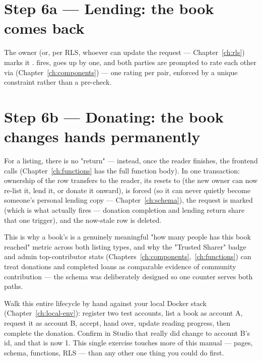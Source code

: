 \section{Step 6a — Lending: the book comes back}

The owner (or, per RLS, whoever can update the request — Chapter~\ref{ch:rls}) marks it .  fires,  goes up by one, and both parties are prompted to rate each other via  (Chapter~\ref{ch:components}) — one rating per  pair, enforced by a unique constraint rather than a pre-check.

\section{Step 6b — Donating: the book changes hands permanently}

For a  listing, there is no "return" — instead, once the reader finishes, the frontend calls  (Chapter~\ref{ch:functions} has the full function body). In one  transaction: ownership of the  row transfers to the reader, its  resets to  (the new owner can now re-list it, lend it, or donate it onward),  is forced  (so it can never quietly become someone's personal lending copy — Chapter~\ref{ch:schema}), the request is marked  (which is what actually fires  — donation completion and lending return share that one trigger), and the now-stale  row is deleted.

\begin{olknote}
This is why a book's  is a genuinely meaningful "how many people has this book reached" metric across both listing types, and why the "Trusted Sharer" badge and admin top-contributor stats (Chapters~\ref{ch:components},~\ref{ch:functions}) can treat donations and completed loans as comparable evidence of community contribution — the schema was deliberately designed so one counter serves both paths.
\end{olknote}

\begin{olktask}
Walk this entire lifecycle by hand against your local Docker stack (Chapter~\ref{ch:local-env}): register two test accounts, list a  book as account A, request it as account B, accept, hand over, update reading progress, then complete the donation. Confirm in Studio that  really did change to account B's id, and that  is now 1. This single exercise touches more of this manual — pages, schema, functions, RLS — than any other one thing you could do first.
\end{olktask}
